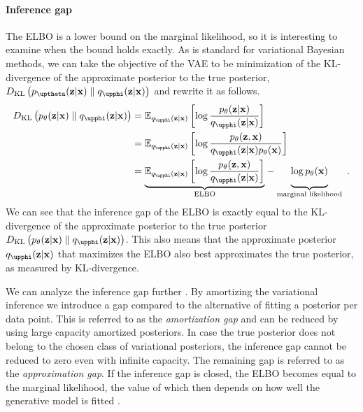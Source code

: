 \paragraph{Inference gap} 
The ELBO is a lower bound on the marginal likelihood, so it is interesting to examine when the bound holds exactly. 
As is standard for variational Bayesian methods, we can take the objective of the VAE to be minimization of the KL-divergence of the approximate posterior to the true posterior, $D_\mathrm{KL}\left( p_\thetab(\zb|\xb) \parallel q_\phib(\zb|\xb) \right)$ and rewrite it as follows.
%
\begin{align}
    D_\text{KL}\left( p_\theta(\zb|\xb) \parallel q_\phib(\zb|\xb) \right)
    &= \mathbb{E}_{q_\phib(\zb|\xb)}\left[ \log \frac{p_\theta(\zb|\xb)}{q_\phib(\zb|\xb)} \right] \nonumber \\
    &= \mathbb{E}_{q_\phib(\zb|\xb)}\left[ \log \frac{p_\theta(\zb,\xb)}{q_\phib(\zb|\xb)p_\theta(\xb)} \right] \nonumber \\
    &= 
    \underset{\text{ELBO}}{\underbrace{
        \mathbb{E}_{q_\phib(\zb|\xb)}\left[ \log \frac{p_\theta(\zb,\xb)}{q_\phib(\zb|\xb)} \right]
    }}
    - 
    \underset{\text{marginal likelihood}}{\underbrace{
        \vphantom{\mathbb{E}_{q_\phib(\zb|\xb)}\left[ \log \frac{p_\theta(\zb,\xb)}{q_\phib(\zb|\xb)} \right]}{\log p_\theta(\xb)}
    }} \enspace .
\end{align}
%
We can see that the inference gap of the ELBO is exactly equal to the KL-divergence of the approximate posterior to the true posterior $D_\text{KL}\left( p_\theta(\zb|\xb) \parallel q_\phib(\zb|\xb) \right)$. 
This also means that the approximate posterior $q_\phib(\zb|\xb)$ that maximizes the ELBO also best approximates the true posterior, as measured by KL-divergence. 

We can analyze the inference gap further \cite{cremer_inference_2018}. 
By amortizing the variational inference we introduce a gap compared to the alternative of fitting a posterior per data point. %
This is referred to as the \emph{amortization gap} and can be reduced by using large capacity amortized posteriors. 
In case the true posterior does not belong to the chosen class of variational posteriors, the inference gap cannot be reduced to zero even with infinite capacity. The remaining gap is referred to as the \emph{approximation gap}. 
If the inference gap is closed, the ELBO becomes equal to the marginal likelihood, the value of which then depends on how well the generative model is fitted \cite{cremer_inference_2018,frellsen_deep_2019}.

